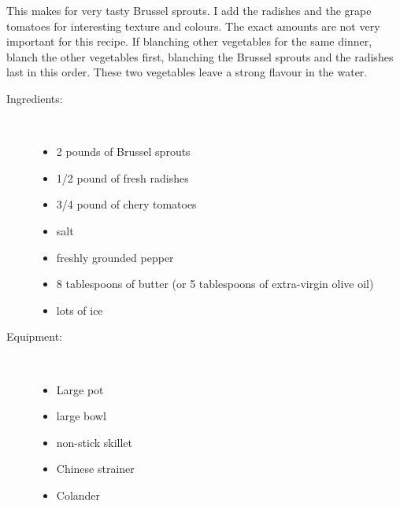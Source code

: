 \documentclass[11pt,letterpaper]{article}
\begin{document}


This makes for very tasty Brussel sprouts. I add the radishes and the grape tomatoes for interesting texture and colours. The exact amounts are not very important for this recipe. If blanching other vegetables for the same dinner, blanch the other vegetables first, blanching the Brussel sprouts and the radishes last in this order. These two vegetables leave a strong flavour in the water.
\begin{description}

\item[Ingredients:]\ \\
	\begin{itemize}
	\item 2 pounds of Brussel sprouts
	\item 1/2 pound of fresh radishes 
	\item 3/4 pound of chery tomatoes
	\item salt
	\item freshly grounded pepper
	\item 8 tablespoons of butter (or 5 tablespoons of extra-virgin olive oil)
	\item lots of ice
	\end{itemize}

\item[Equipment:]\ \\
	\begin{itemize}
	\item Large pot
	\item large bowl
	\item non-stick skillet
	\item Chinese strainer
	\item Colander
	\end{itemize}


\end{description}
\end{document}
